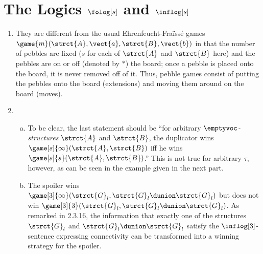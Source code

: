 \section{The Logics $\folog[s]$ and $\inflog[s]$}
\begin{enumerate}[1.]
%
\item {} They are different from the usual Ehrenfeucht-Fra\"iss\'e games $\game{m}(\strct{A}, \vect{a}, \strct{B}, \vect{b})$ in that the number of pebbles are fixed ($s$ for each of $\strct{A}$ and $\strct{B}$ here) and the pebbles are on or off (denoted by $\ast$) the board; once a pebble is placed onto the board, it is never removed off of it. Thus, pebble games consist of putting the pebbles onto the board (extensions) and moving them around on the board (moves).
%
\item {}
\begin{enumerate}[(a)]
\item To be clear, the last statement should be ``for arbitrary \emph{$\emptyvoc$-structures} $\strct{A}$ and $\strct{B}$, the duplicator wins $\game[s]{\infty}(\strct{A}, \strct{B})$ iff he wins $\game[s]{s}(\strct{A}, \strct{B})$.'' This is not true for arbitrary $\tau$, however, as can be seen in the example given in the next part.
\item The spoiler wins $\game[3]{\infty}(\strct{G}_l, \strct{G}_l \dunion \strct{G}_l)$ but does not win $\game[3]{3}(\strct{G}_l, \strct{G}_l \dunion \strct{G}_l)$. As remarked in 2.3.16, the information that exactly one of the structures $\strct{G}_l$ and $\strct{G}_l \dunion \strct{G}_l$ satisfy the $\inflog[3]$-sentence expressing connectivity can be transformed into a winning strategy for the spoiler.
\end{enumerate}


\end{enumerate}
